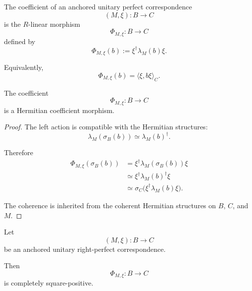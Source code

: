 \begin{definition}
\label{def:higher-anchored-coefficient}
The coefficient of an anchored unitary perfect correspondence
\[
  (M,\xi):B\to C
\]
is the \(R\)-linear morphism
\[
  \Phi_{M,\xi}:B\to C
\]
defined by
\[
  \Phi_{M,\xi}(b)
  :=
  \xi^\dagger\lambda_M(b)\xi.
\]

Equivalently,
\[
  \Phi_{M,\xi}(b)
  =
  \langle\xi,b\xi\rangle_C.
\]
\end{definition}

\begin{proposition}
\label{prop:higher-anchored-coefficient-hermitian}
The coefficient
\[
  \Phi_{M,\xi}:B\to C
\]
is a Hermitian coefficient morphism.
\end{proposition}

\begin{proof}
The left action is compatible with the Hermitian structures:
\[
  \lambda_M(\sigma_B(b))
  \simeq
  \lambda_M(b)^\dagger.
\]

Therefore
\[
\begin{aligned}
  \Phi_{M,\xi}(\sigma_B(b))
  &=
  \xi^\dagger\lambda_M(\sigma_B(b))\xi
  \\
  &\simeq
  \xi^\dagger\lambda_M(b)^\dagger\xi
  \\
  &\simeq
  \sigma_C
  \bigl(
    \xi^\dagger\lambda_M(b)\xi
  \bigr).
\end{aligned}
\]

The coherence is inherited from the coherent Hermitian structures on \(B\),
\(C\), and \(M\).
\end{proof}

\begin{theorem}
\label{thm:higher-anchored-coefficients-csp}
Let
\[
  (M,\xi):B\to C
\]
be an anchored unitary right-perfect correspondence.

Then
\[
  \Phi_{M,\xi}:B\to C
\]
is completely square-positive.
\end{theorem}

